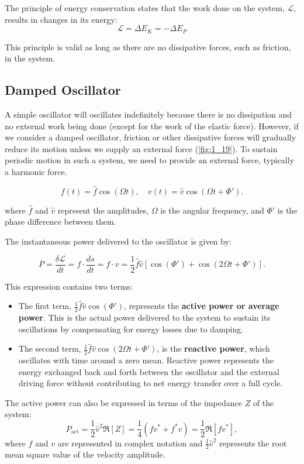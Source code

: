 \documentclass[a4paper]{article}
\begin{document}
The principle of energy conservation states that the work done on the system, \(\mathcal{L}\), results in changes in its energy:
\[
\mathcal{L} = \Delta E_K = -\Delta E_P 
\]


This principle is valid as long as there are no dissipative forces, such as friction, in the system.\\


\subsection{Damped Oscillator}

A simple oscillator will oscillates indefinitely because there is no dissipation and no external work being done (except for the work of the elastic force). However, if we consider a damped oscillator, friction or other dissipative forces will gradually reduce its motion unless we supply an external force (\ref{fig:1_19}). To sustain periodic motion in such a system, we need to provide an external force, typically a harmonic force.

\[
f(t) = \hat{f} \cos(\Omega t), \quad v(t) = \hat{v} \cos(\Omega t + \Phi').
\]

where \(\hat{f}\) and \(\hat{v}\) represent the amplitudes, \(\Omega\) is the angular frequency, and \(\Phi'\) is the phase difference between them.

The instantaneous power delivered to the oscillator is given by:

\[
P = \frac{\delta \mathcal{L}}{dt} = f \cdot \frac{ds}{dt} = f \cdot v = \frac{1}{2} \hat{f} \hat{v} [\cos(\Phi') + \cos(2\Omega t + \Phi')].
\]

This expression contains two terms:
\begin{itemize}
    \item  The first term, \(\frac{1}{2} \hat{f} \hat{v} \cos(\Phi')\), represents the \textbf{active power or average power}. This is the actual power delivered to the system to sustain its oscillations by compensating for energy losses due to damping.
\item The second term, \(\frac{1}{2} \hat{f} \hat{v} \cos(2\Omega t + \Phi')\), is the \textbf{reactive power}, which oscillates with time around a zero mean. Reactive power represents the energy exchanged back and forth between the oscillator and the external driving force without contributing to net energy transfer over a full cycle.
\end{itemize}

The active power can also be expressed in terms of the impedance \(Z\) of the system:
\[
P_{\text{act}} = \frac{1}{2} \hat{v}^2 \Re[Z] = \frac{1}{4} (f v^* + f^* v) = \frac{1}{2} \Re[f v^*],
\]
where \(f\) and \(v\) are represented in complex notation and \(\frac{1}{2}\hat{v}^2\) represents the root mean square value of the velocity amplitude.
\end{document}
